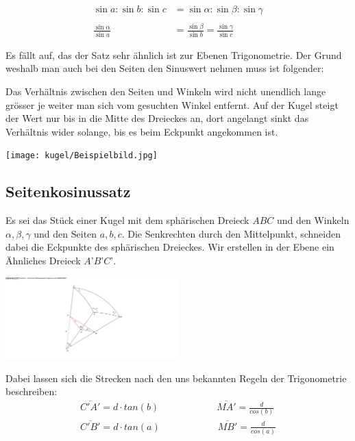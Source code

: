 \begin{refsection}
\begin{align*}
\sin a : \sin b : \sin c &= \sin \alpha : \sin \beta : \sin \gamma \\
 \\
\frac{\sin \alpha}{\sin a} &= \frac{\sin \beta}{\sin b} = \frac{\sin \gamma}{\sin c}
\end{align*} 

Es fällt auf, das der Satz sehr ähnlich ist zur Ebenen Trigonometrie. Der Grund weshalb man auch bei den Seiten den Sinuswert nehmen muss ist folgender:

Das Verhältnis zwischen den Seiten und Winkeln wird nicht unendlich lange grösser je weiter man sich vom gesuchten Winkel entfernt. Auf der Kugel steigt der Wert nur bis in die Mitte des Dreieckes an, dort angelangt sinkt das Verhältnis wider solange, bis es beim Eckpunkt angekommen ist.

\begin{center}
        \texttt{[image: kugel/Beispielbild.jpg]}
\end{center}

\subsection{Seitenkosinussatz}
Es sei das Stück einer Kugel mit dem sphärischen Dreieck $ABC$ und den Winkeln $\alpha, \beta, \gamma$ und den Seiten $a, b, c$. Die Senkrechten durch den Mittelpunkt, schneiden dabei die Eckpunkte des sphärischen Dreieckes. Wir erstellen in der Ebene ein Ähnliches Dreieck $A’B’C’$.

\begin{center}
        \includegraphics[width=0.5\textwidth]{kugel/1Seintenkosinus.jpg}
\end{center}

Dabei lassen sich die Strecken nach den uns bekannten Regeln der Trigonometrie beschreiben:
\begin{align*}
\overline{C'A'} = d\cdot {tan(b)} \quad \quad \quad \quad \quad \quad 
\overline{MA'} = \frac{ d }{cos(b)} \\
\overline{C'B'} = d\cdot {tan(a)} \quad \quad \quad \quad \quad \quad 
\overline{MB'} = \frac{ d }{cos(a)}
\end{align*} 



\end{refsection}
